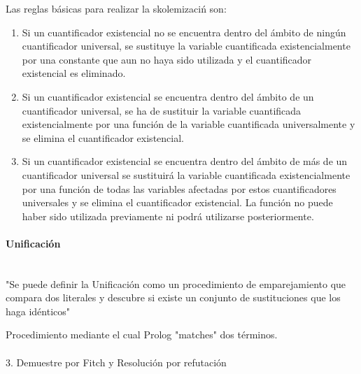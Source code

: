 \documentclass{article}
\begin{document}
 Las reglas básicas para realizar la skolemizaci\'n son:
\begin{enumerate}

\item Si un cuantificador existencial no se encuentra dentro del \'ambito de ning\'un cuantificador universal, se sustituye la variable cuantificada existencialmente por una constante que aun no haya sido utilizada y el cuantificador existencial es eliminado.

\item Si un cuantificador existencial se encuentra dentro del \'ambito de un cuantificador universal, se ha de sustituir la variable cuantificada existencialmente por una funci\'on de la variable cuantificada universalmente y se elimina el cuantificador existencial.
	
\item Si un cuantificador existencial se encuentra dentro del \'ambito de más de un cuantificador universal se sustituir\'a la variable cuantificada existencialmente por una funci\'on de todas las variables afectadas por estos cuantificadores universales y se elimina el cuantificador existencial. La funci\'on no puede haber sido utilizada previamente ni podr\'a utilizarse posteriormente.

\end{enumerate}

\paragraph{Unificaci\'on}\mbox{}\\

"Se puede definir la Unificación como un procedimiento de emparejamiento que compara dos literales y descubre si existe un conjunto de sustituciones que los haga id\'enticos"

Procedimiento mediante el cual Prolog "matches" dos t\'erminos.


\paragraph{}

3. Demuestre por Fitch y Resoluci\'on por refutaci\'on
\end{document}
